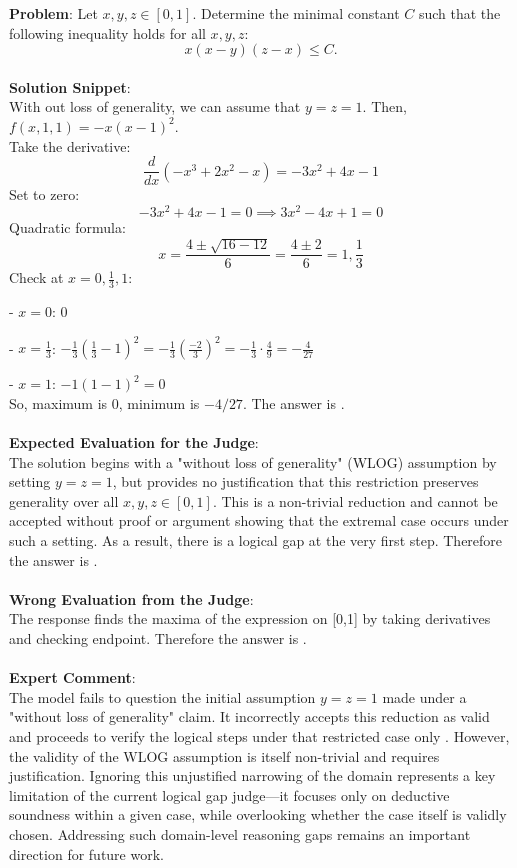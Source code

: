 \begin{examplebox}
\textbf{Problem}: Let $x, y, z \in [0,1]$. Determine the minimal constant $C$ such that the following inequality holds for all $x, y, z$:
$$
x(x-y)(z-x) \leq C.
$$
\\
\textbf{Solution Snippet}: \\
With out loss of generality, we can assume that $y=z=1$. Then, \(f(x, 1, 1) = -x(x-1)^2\).\\
Take the derivative:
\[
\frac{d}{dx}(-x^3 + 2x^2 - x) = -3x^2 + 4x - 1
\]
Set to zero:
\[
-3x^2 + 4x - 1 = 0 \implies 3x^2 - 4x + 1 = 0
\]
Quadratic formula:
\[
x = \frac{4 \pm \sqrt{16 - 12}}{6} = \frac{4 \pm 2}{6} = 1, \frac{1}{3}
\]
Check at \(x=0, \frac{1}{3}, 1\):

\quad - \(x=0\): \(0\)

\quad - \(x=\frac{1}{3}\): \(-\frac{1}{3}(\frac{1}{3}-1)^2 = -\frac{1}{3}(\frac{-2}{3})^2 = -\frac{1}{3} \cdot \frac{4}{9} = -\frac{4}{27}\)

\quad - \(x=1\): \(-1(1-1)^2 = 0\)\\

So, maximum is \(0\), minimum is \(-4/27\). The answer is .
\\\\
\textbf{Expected Evaluation for the Judge}:
\\
The solution begins with a "without loss of generality" (WLOG) assumption by setting $y = z = 1$, but provides no justification that this restriction preserves generality over all $x, y, z \in [0,1]$. This is a non-trivial reduction and cannot be accepted without proof or argument showing that the extremal case occurs under such a setting. As a result, there is a logical gap at the very first step. Therefore the answer is .
\\\\
\textbf{Wrong Evaluation from the Judge}: \\
The response finds the maxima of the expression on [0,1] by taking derivatives and checking endpoint.  Therefore the answer is .
\\\\
\textbf{Expert Comment}: \\
The model fails to question the initial assumption $y = z = 1$ made under a "without loss of generality" claim. It incorrectly accepts this reduction as valid and proceeds to verify the logical steps under that restricted case only \wronghl. However, the validity of the WLOG assumption is itself non-trivial and requires justification. Ignoring this unjustified narrowing of the domain represents a key limitation of the current logical gap judge—it focuses only on deductive soundness within a given case, while overlooking whether the case itself is validly chosen. Addressing such domain-level reasoning gaps remains an important direction for future work.

\end{examplebox}
